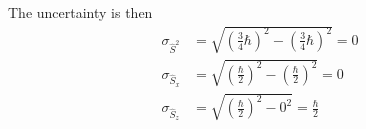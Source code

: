 The uncertainty is then
\begin{equation}
    \begin{split}
        \sigma_{\hat{S}^2} &= \sqrt{(\frac{3}{4}\hbar)^2-(\frac{3}{4}\hbar)^2} = 0\\
        \sigma_{\hat{S}_x} &= \sqrt{(\frac{\hbar}{2})^2-(\frac{\hbar}{2})^2} = 0\\
        \sigma_{\hat{S}_z} &= \sqrt{(\frac{\hbar}{2})^2-0^2}=\frac{\hbar}{2}
    \end{split}
\end{equation}
